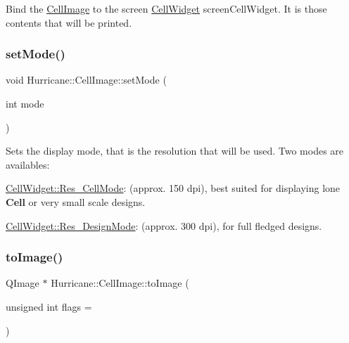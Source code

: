 Bind the \hyperlink{classHurricane_1_1CellImage}{Cell\+Image} to the screen \hyperlink{classHurricane_1_1CellWidget}{Cell\+Widget} {\ttfamily screen\+Cell\+Widget}. It is those contents that will be printed. \mbox{\label{classHurricane_1_1CellImage_aefcd1a8382907eaf13b6aeeaae0c3a6e}} 
\subsubsection{\texorpdfstring{set\+Mode()}{setMode()}}
{\footnotesize\ttfamily void Hurricane\+::\+Cell\+Image\+::set\+Mode (\begin{DoxyParamCaption}\item[{int}]{mode }\end{DoxyParamCaption})\hspace{0.3cm}{\ttfamily [inline]}}

Sets the display mode, that is the resolution that will be used. Two modes are availables\+: 
\begin{DoxyItemize}
\item \hyperlink{classHurricane_1_1CellWidget_a4b81fed78775d491c169b649870d9dd7af37fd1c10fd363f0ad04a94dbccd5789}{Cell\+Widget\+::\+Res\+\_\+\+Cell\+Mode}\+: (approx. 150 dpi), best suited for displaying lone \textbf{ Cell} or very small scale designs. 
\item \hyperlink{classHurricane_1_1CellWidget_a4b81fed78775d491c169b649870d9dd7a0c7c9bd939930fe178b5b8bcd84bdc1e}{Cell\+Widget\+::\+Res\+\_\+\+Design\+Mode}\+: (approx. 300 dpi), for full fledged designs. 
\end{DoxyItemize}\mbox{\label{classHurricane_1_1CellImage_a90ed9b8a07f4302cbeecf52a95ef5578}} 
\subsubsection{\texorpdfstring{to\+Image()}{toImage()}}
{\footnotesize\ttfamily Q\+Image $\ast$ Hurricane\+::\+Cell\+Image\+::to\+Image (\begin{DoxyParamCaption}\item[{unsigned int}]{flags = {} }\end{DoxyParamCaption})}


